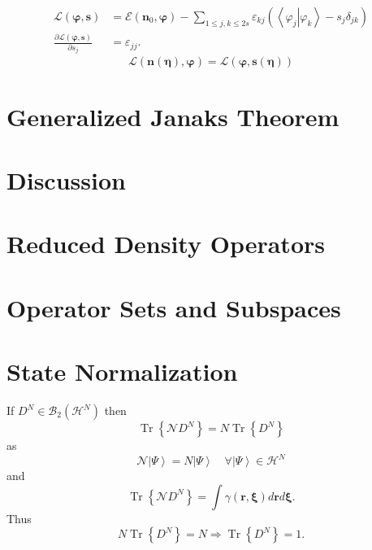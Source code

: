 \documentclass[aps,preprint]{revtex4}%
\begin{document}
\begin{align}
\mathcal{L}\left(  \mathbf{\varphi,s}\right)   &  =\mathcal{E}\left(
\mathbf{n}_{0}\mathbf{,\varphi}\right)  -\sum_{1\leq j,k\leq2s}\varepsilon
_{kj}\left(  \left\langle \left.  \varphi_{j}\right\vert \varphi
_{k}\right\rangle -s_{j}\delta_{jk}\right) \\
\frac{\partial\mathcal{L}\left(  \mathbf{\varphi,s}\right)  }{\partial s_{j}}
&  =\varepsilon_{jj}.
\end{align}%
\begin{equation}
\mathcal{L}\left(  \mathbf{n\left(  \mathbf{\eta}\right)  ,\varphi}\right)
=\mathcal{L}\left(  \mathbf{\varphi,s}\left(  \mathbf{\eta}\right)  \right)
\end{equation}


\section{\bigskip Generalized Janaks Theorem\label{General}}

\section{\bigskip Discussion}

\appendix

\section{Reduced Density Operators \label{Denmat}}

\bigskip

\section{Operator Sets and Subspaces \label{Operators}}

\bigskip

\section{State Normalization \label{Normalization}}

If $D^{N}\in\mathcal{B}_{2}\left(  \mathcal{H}^{N}\right)  $ then
\begin{equation}
\operatorname{Tr}\left\{  \mathcal{N}D^{N}\right\}  =N\operatorname{Tr}%
\left\{  D^{N}\right\}
\end{equation}
as
\begin{equation}
\mathcal{N}\left\vert \Psi\right\rangle =N\left\vert \Psi\right\rangle
\quad\forall\left\vert \Psi\right\rangle \in\mathcal{H}^{N}%
\end{equation}
and
\begin{equation}
\operatorname{Tr}\left\{  \mathcal{N}D^{N}\right\}  =\int\gamma\left(
\mathbf{r,\xi}\right)  d\mathbf{r}d\mathbf{\xi.}%
\end{equation}
Thus
\begin{equation}
N\operatorname{Tr}\left\{  D^{N}\right\}  =N\Rightarrow\operatorname{Tr}%
\left\{  D^{N}\right\}  =1.
\end{equation}
\end{document}
